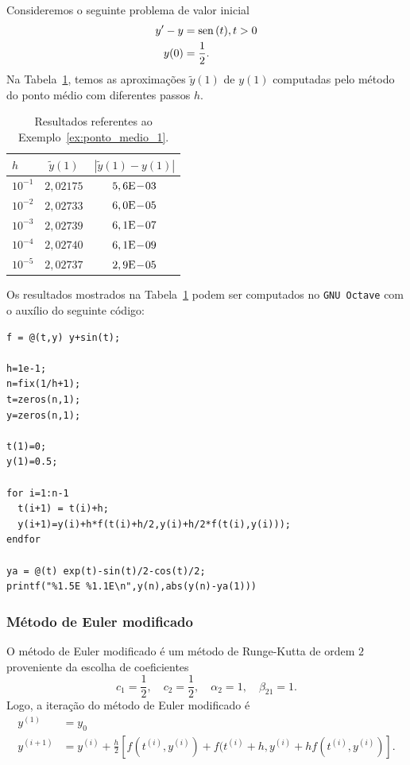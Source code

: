 \begin{ex}\label{ex:ponto_medio_1}
  Consideremos o seguinte problema de valor inicial
  \begin{align}
    y' - y &= \operatorname{sen}\,(t), t>0\\
    y(0) &= \frac{1}{2}.
  \end{align}
  Na Tabela~\ref{tab:ex_ponto_medio_1}, temos as aproximações $\tilde{y}(1)$ de $y(1)$ computadas pelo método do ponto médio com diferentes passos $h$.
 
  \begin{table}[h!]
    \centering
    \begin{tabular}{l|cc}
      $h$ & $\tilde{y}(1)$ & $|\tilde{y}(1)-y(1)|$\\\hline
      $10^{-1}$ & $2,02175$ & $5,6\mathrm{E}\!-\!03$ \\
      $10^{-2}$ & $2,02733$ & $6,0\mathrm{E}\!-\!05$ \\
      $10^{-3}$ & $2,02739$ & $6,1\mathrm{E}\!-\!07$ \\
      $10^{-4}$ & $2,02740$ & $6,1\mathrm{E}\!-\!09$ \\
      $10^{-5}$ & $2,02737$ & $2,9\mathrm{E}\!-\!05$ \\\hline
    \end{tabular}
    \caption{Resultados referentes ao Exemplo~\ref{ex:ponto_medio_1}.}
    \label{tab:ex_ponto_medio_1}
  \end{table}

\ifisoctave
Os resultados mostrados na Tabela~\ref{tab:ex_ponto_medio_1} podem ser computados no \verb+GNU Octave+ com o auxílio do seguinte código:
\begin{verbatim}
f = @(t,y) y+sin(t);

h=1e-1;
n=fix(1/h+1);
t=zeros(n,1);
y=zeros(n,1);

t(1)=0;
y(1)=0.5;

for i=1:n-1
  t(i+1) = t(i)+h;
  y(i+1)=y(i)+h*f(t(i)+h/2,y(i)+h/2*f(t(i),y(i)));
endfor

ya = @(t) exp(t)-sin(t)/2-cos(t)/2;
printf("%1.5E %1.1E\n",y(n),abs(y(n)-ya(1)))
\end{verbatim}
\fi
\end{ex}

\subsubsection{Método de Euler modificado}

O método de Euler modificado é um método de Runge-Kutta de ordem $2$ proveniente da escolha de coeficientes
\begin{equation}
  c_1 = \frac{1}{2}, \quad c_2 = \frac{1}{2}, \quad \alpha_2 = 1,\quad \beta_{21}=1.
\end{equation}
Logo, a iteração do método de Euler modificado é
\begin{align}
  y^{(1)} &= y_0\\
  y^{(i+1)} &= y^{(i)} + \frac{h}{2}\left[f(t^{(i)},y^{(i)}) + f(t^{(i)}+h,y^{(i)}+hf(t^{(i)},y^{(i)})\right].
\end{align}

